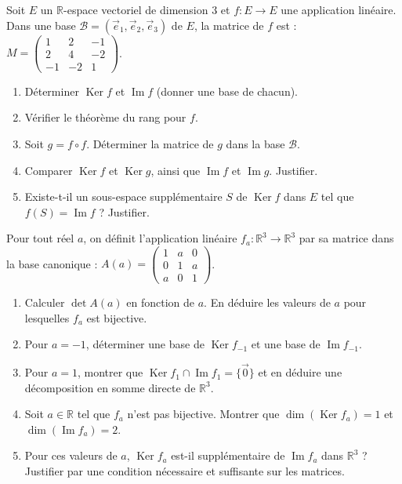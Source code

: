 \documentclass[11pt]{article}
\begin{document}
\begin{exercice}
Soit $E$ un $\mathbb{R}$-espace vectoriel de dimension 3 et $f : E \to E$ une application linéaire.
Dans une base $\mathcal{B} = (\vec{e}_1, \vec{e}_2, \vec{e}_3)$ de $E$, la matrice de $f$ est :
$M = \begin{pmatrix} 1 & 2 & -1 \\ 2 & 4 & -2 \\ -1 & -2 & 1 \end{pmatrix}$.
\begin{enumerate}
    \item Déterminer $\operatorname{Ker} f$ et $\operatorname{Im} f$ (donner une base de chacun).
    \item Vérifier le théorème du rang pour $f$.
    \item Soit $g = f \circ f$. Déterminer la matrice de $g$ dans la base $\mathcal{B}$.
    \item Comparer $\operatorname{Ker} f$ et $\operatorname{Ker} g$, ainsi que $\operatorname{Im} f$ et $\operatorname{Im} g$. Justifier.
    \item Existe-t-il un sous-espace supplémentaire $S$ de $\operatorname{Ker} f$ dans $E$ tel que $f(S) = \operatorname{Im} f$ ? Justifier.
\end{enumerate}
\end{exercice}

\begin{exercice}
Pour tout réel $a$, on définit l'application linéaire $f_a : \mathbb{R}^3 \to \mathbb{R}^3$ par sa matrice dans la base canonique :
$A(a) = \begin{pmatrix} 1 & a & 0 \\ 0 & 1 & a \\ a & 0 & 1 \end{pmatrix}$.
\begin{enumerate}
    \item Calculer $\det A(a)$ en fonction de $a$. En déduire les valeurs de $a$ pour lesquelles $f_a$ est bijective.
    \item Pour $a = -1$, déterminer une base de $\operatorname{Ker} f_{-1}$ et une base de $\operatorname{Im} f_{-1}$.
    \item Pour $a = 1$, montrer que $\operatorname{Ker} f_1 \cap \operatorname{Im} f_1 = \{\vec{0}\}$ et en déduire une décomposition en somme directe de $\mathbb{R}^3$.
    \item Soit $a \in \mathbb{R}$ tel que $f_a$ n'est pas bijective. Montrer que $\dim(\operatorname{Ker} f_a) = 1$ et $\dim(\operatorname{Im} f_a) = 2$.
    \item Pour ces valeurs de $a$, $\operatorname{Ker} f_a$ est-il supplémentaire de $\operatorname{Im} f_a$ dans $\mathbb{R}^3$ ? Justifier par une condition nécessaire et suffisante sur les matrices.
\end{enumerate}
\end{exercice}
\end{document}

